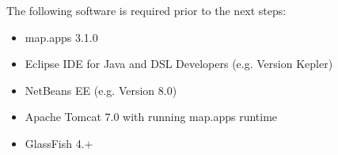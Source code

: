 


The following software is required prior to the next steps:

\begin{itemize}
\item map.apps 3.1.0
\item Eclipse IDE for Java and DSL Developers (e.g. Version Kepler)
\item NetBeans EE (e.g. Version 8.0)
\item Apache Tomcat 7.0 with running map.apps runtime
\item GlassFish 4.+
\end{itemize}


